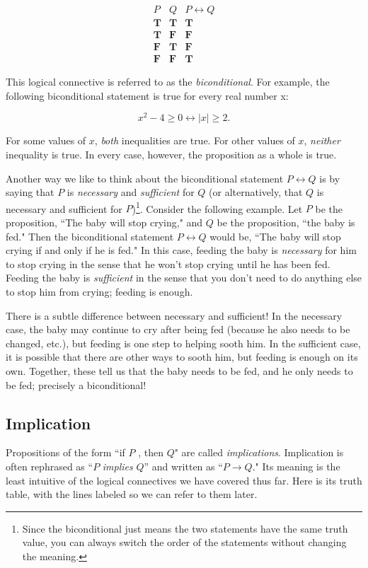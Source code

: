 \documentclass[11pt,oneside]{book}
\theoremstyle{definition}
\newcommand{\T}{\mathbf{T}}
\newcommand{\F}{\mathbf{F}}
\begin{document}
\[\begin{array}{c|c|c}
    P & Q & P \leftrightarrow Q \\
    \hline
    \T & \T & \T \\
    \T & \F & \F \\
    \F & \T & \F \\
    \F & \F & \T
\end{array}\]

This logical connective is referred to as the \emph{biconditional}.
For example, the following biconditional statement is true for every real number
x:

\[ x^{2} - 4 \geq 0 \leftrightarrow |x| \geq 2. \]

For some values of $x$, \emph{both} inequalities are true.
For other values of $x$, \emph{neither} inequality is true.
In every case, however, the proposition as a whole is true.

Another way we like to think about the biconditional statement $P \leftrightarrow Q$ is by saying that $P$ is \emph{necessary} and \emph{sufficient} for $Q$ (or alternatively, that $Q$ is necessary and sufficient for $P$)\footnote{
    Since the biconditional just means the two statements have the same truth value, you can always switch the order of the statements without changing the meaning.
}.
Consider the following example.
Let $P$ be the proposition, ``The baby will stop crying," and $Q$ be the proposition, ``the baby is fed."
Then the biconditional statement $P \leftrightarrow Q$ would be, ``The baby will stop crying if and only if he is fed."
In this case, feeding the baby is \emph{necessary} for him to stop crying in the sense that he won't stop crying until he has been fed.
Feeding the baby is \emph{sufficient} in the sense that you don't need to do anything else to stop him from crying; feeding is enough.

There is a subtle difference between necessary and sufficient!
In the necessary case, the baby may continue to cry after being fed (because he also needs to be changed, etc.), but feeding is one step to helping sooth him.
In the sufficient case, it is possible that there are other ways to sooth him, but feeding is enough on its own.
Together, these tell us that the baby needs to be fed, and he only needs to be fed; precisely a biconditional!


\subsection{Implication}
Propositions of the form ``if $P$ , then $Q$" are called \emph{implications}.
Implication is often rephrased as ``$P$ \emph{implies} $Q$” and written as ``$P \rightarrow Q$."
Its meaning is the least intuitive of the logical connectives we have covered thus far.
Here is its truth table, with the lines labeled so we can refer to them later.
\end{document}
